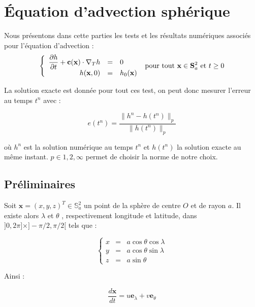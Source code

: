 
\chapter{\'Equation d'advection sphérique}

Nous présentons dans cette parties les tests et les résultats numériques associés pour l'équation d'advection :
\begin{equation}
\label{eq:advection spherique}
\left\lbrace
\begin{array}{r cl}
\dfrac{\partial h}{\partial t} + \mathbf{c} ( \mathbf{x} ) \cdot \nabla_ T h & = & 0 \\
h(\mathbf{x},0) & = & h_0 ( \mathbf{x} )
\end{array}
\right. \text{ pour tout } \mathbf{x} \in \mathbf{S}_a^2 \text{ et } t \geq 0
\end{equation}

La solution exacte est donnée pour tout ces test, on peut donc mesurer l'erreur au temps $t^n$ avec :

\begin{equation}
\label{erreur relative}
e(t^n) = \dfrac{\| h^n - h(t^n) \|_p}{\| h(t^n) \|_p}
\end{equation}

où $h^n$ est la solution numérique au temps $t^n$ et $h(t^n)$ la solution exacte au même instant. $p \in {1, 2, \infty }$ permet de choisir la norme de notre choix.

\section{Préliminaires}

Soit $\mathbf{x} = (x,y,z)^T \in \mathbb{S}_a^2$ un point de la sphère de centre $O$ et de rayon $a$. Il existe alors $\lambda$ et $\theta$ , respectivement longitude et latitude, dans $] 0, 2 \pi ] \times ] - \pi /2, \pi/2 [ $ tels que :

\begin{equation}
\left\lbrace 
\begin{array}{rcl}
x & = & a \cos \theta \cos \lambda \\
y & = & a \cos \theta \sin \lambda \\
z & = & a \sin \theta
\end{array}
\right.
\end{equation}

Ainsi :

\begin{equation}
\dfrac{d \mathbf{x}}{dt} = u \mathbf{e}_{\lambda} + v \mathbf{e}_{\theta}
\end{equation}

